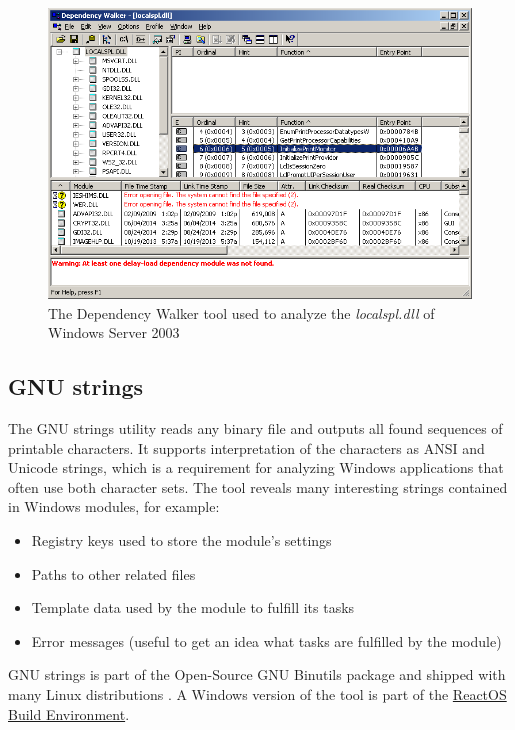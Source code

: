 \begin{figure}[t]
	\centering
	\includegraphics{images/depends.png}
	\caption{The Dependency Walker tool used to analyze the \emph{localspl.dll} of Windows Server 2003}
	\label{fig:DependencyWalker}
\end{figure}


\subsection{GNU strings}
The GNU strings utility reads any binary file and outputs all found sequences of printable characters.
It supports interpretation of the characters as ANSI and Unicode strings, which is a requirement for analyzing Windows applications that often use both character sets.
The tool reveals many interesting strings contained in Windows modules, for example:

\begin{itemize}
	\item Registry keys used to store the module's settings
	\item Paths to other related files
	\item Template data used by the module to fulfill its tasks
	\item Error messages (useful to get an idea what tasks are fulfilled by the module)
\end{itemize}

GNU strings is part of the Open-Source GNU Binutils package and shipped with many Linux distributions \cite{fsf2015strings}.
A Windows version of the tool is part of the \href{https://www.reactos.org/wiki/Build_Environment}{ReactOS Build Environment}.


